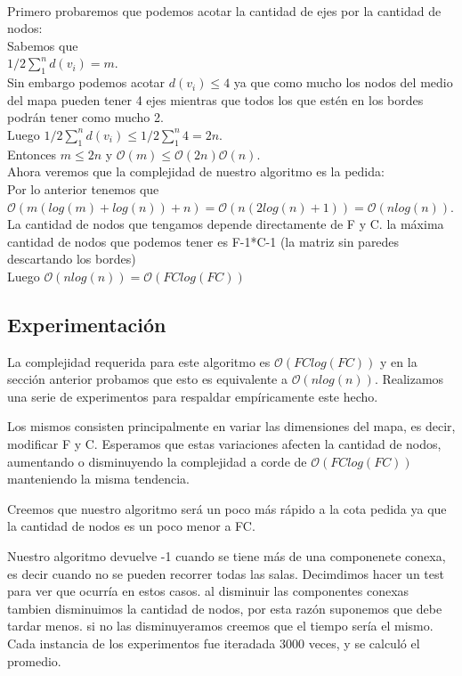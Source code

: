 \documentclass[spanish,12pt]{article}
\begin{document}
\\
Primero probaremos que podemos acotar la cantidad de ejes por la cantidad de nodos:
\\
Sabemos que
\\
 $1/2  \sum_{1}^{n}d(v_{i}) =m $. 
\\
Sin embargo podemos acotar $d(v_{i}) \leq 4$ ya que como mucho los nodos del medio del mapa pueden tener 4 ejes mientras que todos los que estén en los bordes podrán tener como mucho 2.
\\
 Luego $1/2  \sum_{1}^{n}{d(v_{i})} \leq 1/2 \sum_{1}^{n}{4} = 2n$.
\\
 Entonces $m \leq 2n$ y $\mathcal{O}(m) \leq \mathcal{O}(2n) \mathcal{O}(n)$.
\\
Ahora veremos que la complejidad de nuestro algoritmo es la pedida:
\\
Por lo anterior tenemos que $\mathcal{O}(m(log(m)+log(n))+n)= \mathcal{O}(n(2log(n)+1)) = \mathcal{O}(nlog(n))$.
\\
La cantidad de nodos que tengamos depende directamente de F y C. la máxima cantidad de nodos que podemos tener es F-1*C-1 (la matriz sin paredes descartando los bordes) 
\\
Luego $\mathcal{O}(nlog(n)) = \mathcal{O}(FClog(FC))$


\subsection{Experimentación}

La complejidad requerida para este algoritmo es $\mathcal{O}(FClog(FC))$ y en la sección anterior probamos que esto es equivalente a  $\mathcal{O}(nlog(n))$.
Realizamos una serie de experimentos para respaldar empíricamente este hecho.

Los mismos consisten principalmente en variar las dimensiones del mapa, es decir, modificar F y C. Esperamos que estas variaciones afecten la cantidad de nodos, aumentando o disminuyendo la complejidad a corde de $\mathcal{O}(FClog(FC))$ manteniendo la misma tendencia.

Creemos que nuestro algoritmo será un poco más rápido a la cota pedida ya que la cantidad de nodos es un poco menor a FC.

Nuestro algoritmo devuelve -1 cuando se tiene más de una componenete conexa, es decir cuando no se pueden recorrer todas las salas. Decimdimos hacer un test para ver que ocurría en estos casos. al disminuir las componentes conexas tambien disminuimos la cantidad de nodos, por esta razón suponemos que debe tardar menos. si no las disminuyeramos creemos que el tiempo sería el mismo.
\\
Cada instancia de los experimentos fue iteradada 3000 veces, y se calculó el promedio.
\end{document}
